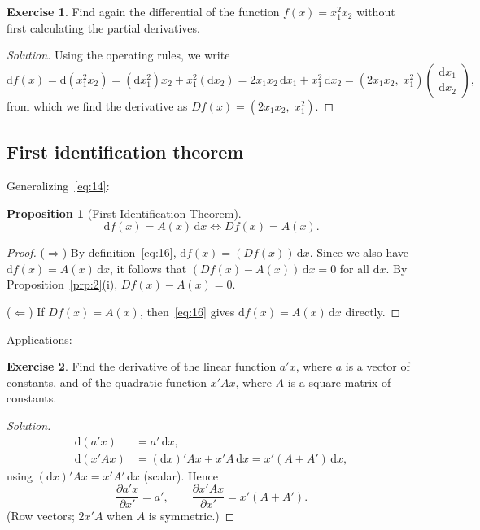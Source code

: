 \documentclass[14pt]{extarticle}
\theoremstyle{plain}
\newtheorem{proposition}{Proposition}
\theoremstyle{definition}
\newtheorem{exercise}{Exercise}
\theoremstyle{remark}
\newenvironment{solution}{%
  \begin{proof}[Solution]%
}{%
  \end{proof}%
}
\newcommand{\dd}{\mathrm{d}}
\begin{document}
\begin{exercise}\label{exer:10}
Find again the differential of the function $f(x) = x_1^2 x_2$ without first calculating the partial derivatives.
\end{exercise}

\begin{solution}
Using the operating rules, we write
\[
\dd f(x) = \dd(x_1^2 x_2) = (\dd x_1^2) x_2 + x_1^2 (\dd x_2)
= 2x_1 x_2\, \dd x_1 + x_1^2\, \dd x_2
= (2x_1 x_2,\; x_1^2) \begin{pmatrix} \dd x_1 \\ \dd x_2 \end{pmatrix},
\]
from which we find the derivative as $Df(x) = (2x_1 x_2,\; x_1^2)$.
\end{solution}

\subsection{First identification theorem}\label{sec:4.4}

Generalizing~\eqref{eq:14}:

\begin{proposition}[First Identification Theorem]\label{prp:11}
\[
\dd f(x) = A(x)\, \dd x \iff Df(x) = A(x).
\]
\end{proposition}

\begin{proof}
($\Rightarrow$) By definition~\eqref{eq:16}, $\dd f(x) = (Df(x))\, \dd x$. Since we also have $\dd f(x) = A(x)\, \dd x$, it follows that $(Df(x) - A(x))\, \dd x = 0$ for all $\dd x$. By Proposition~\ref{prp:2}(i), $Df(x) - A(x) = 0$.

($\Leftarrow$) If $Df(x) = A(x)$, then~\eqref{eq:16} gives $\dd f(x) = A(x)\, \dd x$ directly.
\end{proof}

Applications:

\begin{exercise}\label{exer:11}
Find the derivative of the linear function $a'x$, where $a$ is a vector of constants, and of the quadratic function $x'Ax$, where $A$ is a square matrix of constants.
\end{exercise}

\begin{solution}
\begin{align*}
\dd(a'x) &= a'\, \dd x, \\
\dd(x'Ax) &= (\dd x)'Ax + x'A\, \dd x = x'(A + A')\, \dd x,
\end{align*}
using $(\dd x)'Ax = x'A'\,\dd x$ (scalar). Hence
\[
\frac{\partial a'x}{\partial x'} = a', \qquad \frac{\partial x'Ax}{\partial x'} = x'(A + A').
\]
(Row vectors; $2x'A$ when $A$ is symmetric.)
\end{solution}
\end{document}
